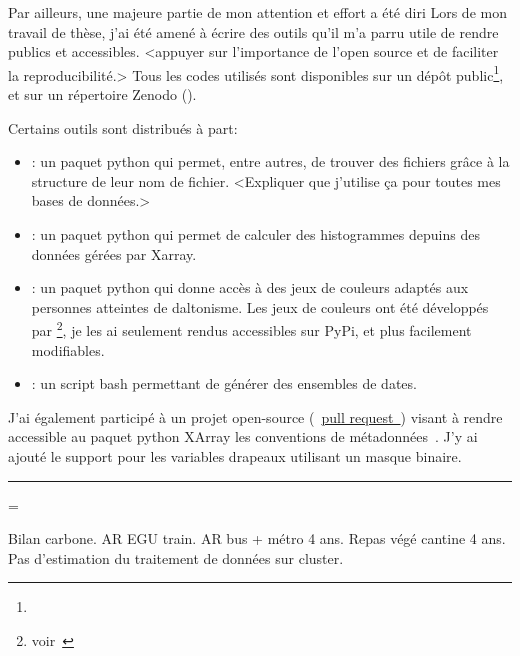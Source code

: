 Par ailleurs, une majeure partie de mon attention et effort a été diri
Lors de mon travail de thèse, j'ai été amené à écrire des outils qu'il m'a parru utile de rendre publics et accessibles.
<appuyer sur l'importance de l'open source et de faciliter la reproducibilité.>
Tous les codes utilisés sont disponibles sur un dépôt public\footnote{%
}, et sur un répertoire Zenodo ().
\medskip

Certains outils sont distribués à part:
\begin{itemize}
  \item {}:
        un paquet python qui permet, entre autres, de trouver des fichiers grâce à la structure de leur nom de fichier.
        <Expliquer que j'utilise ça pour toutes mes bases de données.>
  \item {}:
        un paquet python qui permet de calculer des histogrammes depuins des données gérées par Xarray.
  \item {}:
        un paquet python qui donne accès à des jeux de couleurs adaptés aux personnes atteintes de daltonisme. Les jeux de couleurs ont été développés par \footnote{voir~}, je les ai seulement rendus accessibles sur PyPi, et plus facilement modifiables.
  \item {}:
        un script bash permettant de générer des ensembles de dates.
\end{itemize}
\medskip

J'ai également participé à un projet open-source (~\href{https://github.com/xarray-contrib/cf-xarray/pull/354}{pull request~}) visant à rendre accessible au paquet python XArray les conventions de métadonnées~.
J'y ai ajouté le support pour les variables drapeaux utilisant un masque binaire.

\begin{center}
  \vspace{1\baselineskip}
  \rule{0.77\textwidth}{0.5pt}
  \vspace{1\baselineskip}
\end{center}

{%
  \raggedright%
  \emergencystretch=\textwidth
  \printbibliography[heading=none, type=software, keyword=personnal]
}


Bilan carbone.
AR EGU train.
AR bus + métro 4 ans.
Repas végé cantine 4 ans.
Pas d'estimation du traitement de données sur cluster.
